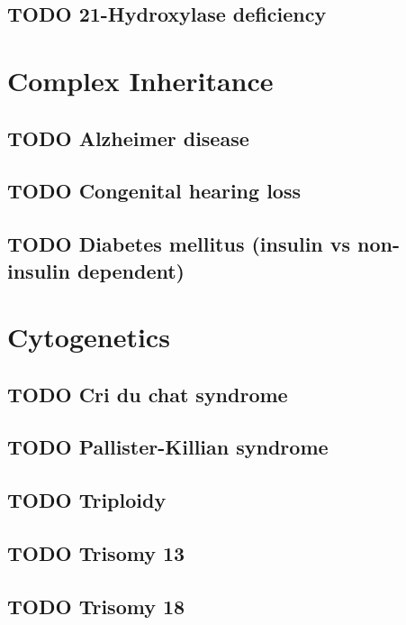 \documentclass{scrartcl}
\begin{document}
\subsection{{\bfseries\sffamily TODO} 21-Hydroxylase deficiency}
\label{sec:org524eafa}

\section{Complex Inheritance}
\label{sec:orgf374d07}
\subsection{{\bfseries\sffamily TODO} Alzheimer disease}
\label{sec:orgb428f55}
\subsection{{\bfseries\sffamily TODO} Congenital hearing loss}
\label{sec:orgcac9f4e}
\subsection{{\bfseries\sffamily TODO} Diabetes mellitus (insulin vs non-insulin dependent)}
\label{sec:orgf95209f}

\section{Cytogenetics}
\label{sec:orgd6f4985}
\subsection{{\bfseries\sffamily TODO} Cri du chat syndrome}
\label{sec:org36956de}
\subsection{{\bfseries\sffamily TODO} Pallister-Killian syndrome}
\label{sec:org4879fd4}
\subsection{{\bfseries\sffamily TODO} Triploidy}
\label{sec:org1c168b2}
\subsection{{\bfseries\sffamily TODO} Trisomy 13}
\label{sec:org6f65aed}
\subsection{{\bfseries\sffamily TODO} Trisomy 18}
\label{sec:orgdd84133}
\end{document}
